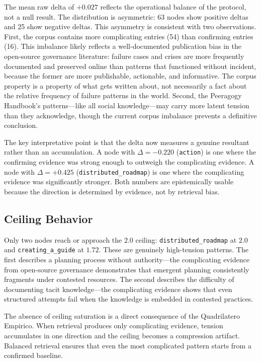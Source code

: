 \documentclass[10pt,twocolumn]{article}
\begin{document}
The mean raw delta of $+0.027$ reflects the operational balance of the protocol, not a null result. The distribution is asymmetric: 63 nodes show positive deltas and 25 show negative deltas. This asymmetry is consistent with two observations. First, the corpus contains more complicating entries (54) than confirming entries (16). This imbalance likely reflects a well-documented publication bias in the open-source governance literature: failure cases and crises are more frequently documented and preserved online than patterns that functioned without incident, because the former are more publishable, actionable, and informative. The corpus property is a property of what gets written about, not necessarily a fact about the relative frequency of failure patterns in the world. Second, the Peeragogy Handbook's patterns---like all social knowledge---may carry more latent tension than they acknowledge, though the current corpus imbalance prevents a definitive conclusion.

The key interpretative point is that the delta now measures a genuine resultant rather than an accumulation. A node with $\Delta=-0.220$ (\texttt{action}) is one where the confirming evidence was strong enough to outweigh the complicating evidence. A node with $\Delta=+0.425$ (\texttt{distributed\_roadmap}) is one where the complicating evidence was significantly stronger. Both numbers are epistemically usable because the direction is determined by evidence, not by retrieval bias.

\subsection{Ceiling Behavior}

Only two nodes reach or approach the $2.0$ ceiling: \texttt{distributed\_roadmap} at $2.0$ and \texttt{creating\_a\_guide} at $1.72$. These are genuinely high-tension patterns. The first describes a planning process without authority---the complicating evidence from open-source governance demonstrates that emergent planning consistently fragments under contested resources. The second describes the difficulty of documenting tacit knowledge---the complicating evidence shows that even structured attempts fail when the knowledge is embedded in contested practices.

The absence of ceiling saturation is a direct consequence of the Quadrilatero Empirico. When retrieval produces only complicating evidence, tension accumulates in one direction and the ceiling becomes a compression artifact. Balanced retrieval ensures that even the most complicated pattern starts from a confirmed baseline.
\end{document}
